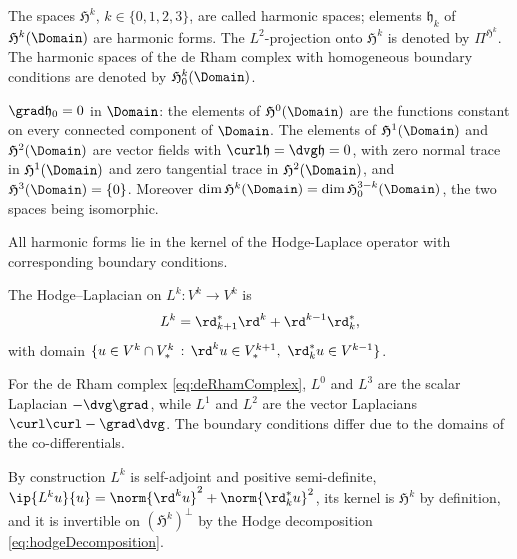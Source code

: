 \documentclass[%
 reprint,
 superscriptaddress,
 amsmath,amssymb,
 aps, nofootinbib, floatfix]{revtex4-2}
\begin{document}
\begin{definition}
    \label{def:harmonic_forms}
    The spaces $\mathfrak{H}^k$, $k \in \{ 0, 1, 2, 3 \}$, are called harmonic spaces; elements $\mathfrak h_k$ of $\mathfrak{H}^k(\Domain)$ are harmonic forms. The $L^2$-projection onto $\mathfrak H^k$ is denoted by $\Pi^{{\mathfrak H}^k}$. The harmonic spaces of the de Rham complex with homogeneous boundary conditions are denoted by $\mathfrak H^k_0(\Domain)$.
\end{definition}

\begin{lemma}
    \label{lem:harmonic_spaces}
    $\grad \mathfrak{h}_0 = 0$ in $\Domain$: the elements of $\mathfrak H^0(\Domain)$ are the functions constant on every connected component of $\Domain$. The elements of $\mathfrak{H}^1(\Domain)$ and $\mathfrak{H}^2(\Domain)$ are vector fields with $\curl \mathfrak h = \dvg \mathfrak h = 0$, with zero normal trace in $\mathfrak{H}^1(\Domain)$ and zero tangential trace in $\mathfrak{H}^2(\Domain)$, and $\mathfrak{H}^3(\Domain) = \{ 0 \}$. Moreover $\dim {\mathfrak H}^k(\Domain) = \dim {\mathfrak H}^{3-k}_0(\Domain)$, the two spaces being isomorphic.
\end{lemma}

All harmonic forms lie in the kernel of the Hodge-Laplace operator with corresponding boundary conditions.

\begin{definition}
    \label{def:hodgeLaplacian}
    The Hodge--Laplacian on $L^k : V^k \to V^k$ is
    \begin{align}
        \label{eq:hodgeLaplacian}
        L^k = \rd^*_{k+1} \rd^k + \rd^{k-1} \rd^*_k,
    \end{align}
    with domain $\{ u \in V^k \cap V^k_* \,:\, \rd^k u \in V^{k+1}_*,\ \rd^*_k u \in V^{k-1} \}$.
    
    For the de Rham complex \eqref{eq:deRhamComplex}, $L^0$ and $L^3$ are the scalar Laplacian $-\dvg \grad$, while $L^1$ and $L^2$ are the vector Laplacians $\curl \curl - \grad \dvg$. The boundary conditions differ due to the domains of the co-differentials.
\end{definition}

By construction $L^k$ is self-adjoint and positive semi-definite, $\ip{L^k u}{u} = \norm{\rd^k u}^2 + \norm{\rd^*_k u}^2$, its kernel is $\mathfrak H^k$ by definition, and it is invertible on $(\mathfrak{H}^k)^\perp$ by the Hodge decomposition \eqref{eq:hodgeDecomposition}.
\end{document}
